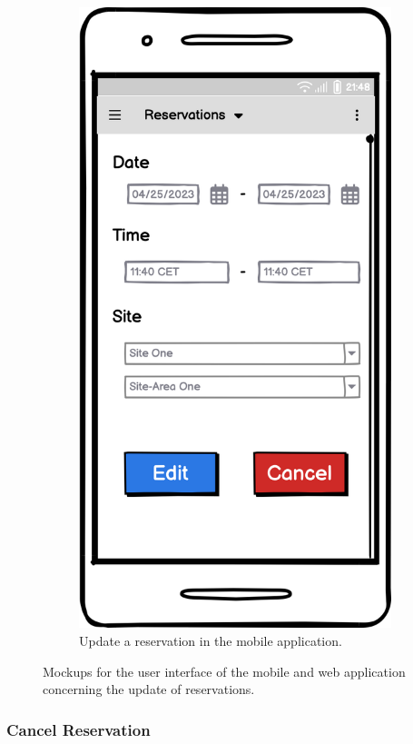 \begin{figure}[h]
\begin{subfigure}[c]{0.3\textwidth}
         \includegraphics[width=\textwidth,height=1.6\textwidth,keepaspectratio]{resources/images/main/5_design/mockups/update_reservation/mobile/Edit_Reservation.png}
         \caption{Update a reservation in the mobile application.}
         \label{fig:mobile-update-reservation-mockup}
    \end{subfigure}
    \caption{Mockups for the user interface of the mobile and web application concerning the update of reservations.}
    \label{fig:mockups-update-reservation}
\end{figure}

\clearpage

\subsubsection{Cancel Reservation}
\label{ch:Design:sec:Reservation System:ssec:Management Capabilities:sssec:Cancel Reservation}

